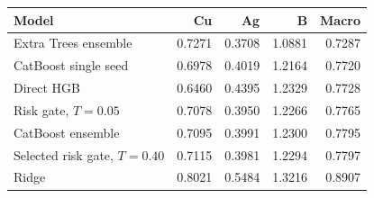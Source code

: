 \begin{tabular}{lrrrr}
\toprule
Model & Cu & Ag & B & Macro \\
\midrule
Extra Trees ensemble & 0.7271 & 0.3708 & 1.0881 & 0.7287 \\
CatBoost single seed & 0.6978 & 0.4019 & 1.2164 & 0.7720 \\
Direct HGB & 0.6460 & 0.4395 & 1.2329 & 0.7728 \\
Risk gate, $T=0.05$ & 0.7078 & 0.3950 & 1.2266 & 0.7765 \\
CatBoost ensemble & 0.7095 & 0.3991 & 1.2300 & 0.7795 \\
Selected risk gate, $T=0.40$ & 0.7115 & 0.3981 & 1.2294 & 0.7797 \\
Ridge & 0.8021 & 0.5484 & 1.3216 & 0.8907 \\
\bottomrule
\end{tabular}
